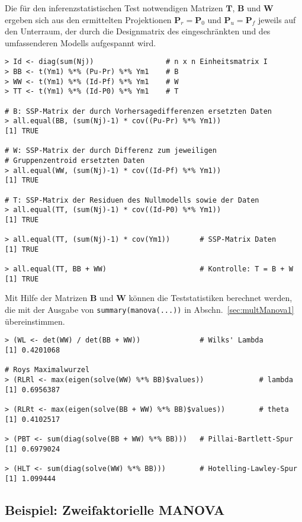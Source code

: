 Die für den inferenzstatistischen Test notwendigen Matrizen $\bm{T}$, $\bm{B}$ und $\bm{W}$ ergeben sich aus den ermittelten Projektionen $\bm{P}_{r} = \bm{P}_{0}$ und $\bm{P}_{u} = \bm{P}_{f}$ jeweils auf den Unterraum, der durch die Designmatrix des eingeschränkten und des umfassenderen Modells aufgespannt wird.
\begin{lstlisting}
> Id <- diag(sum(Nj))                 # n x n Einheitsmatrix I
> BB <- t(Ym1) %*% (Pu-Pr) %*% Ym1    # B
> WW <- t(Ym1) %*% (Id-Pf) %*% Ym1    # W
> TT <- t(Ym1) %*% (Id-P0) %*% Ym1    # T

# B: SSP-Matrix der durch Vorhersagedifferenzen ersetzten Daten
> all.equal(BB, (sum(Nj)-1) * cov((Pu-Pr) %*% Ym1))
[1] TRUE

# W: SSP-Matrix der durch Differenz zum jeweiligen
# Gruppenzentroid ersetzten Daten
> all.equal(WW, (sum(Nj)-1) * cov((Id-Pf) %*% Ym1))
[1] TRUE

# T: SSP-Matrix der Residuen des Nullmodells sowie der Daten
> all.equal(TT, (sum(Nj)-1) * cov((Id-P0) %*% Ym1))
[1] TRUE

> all.equal(TT, (sum(Nj)-1) * cov(Ym1))       # SSP-Matrix Daten
[1] TRUE

> all.equal(TT, BB + WW)                      # Kontrolle: T = B + W
[1] TRUE
\end{lstlisting}

Mit Hilfe der Matrizen $\bm{B}$ und $\bm{W}$ können die Teststatistiken berechnet werden, die mit der Ausgabe von \lstinline!summary(manova(...))! in Abschn.\ \ref{sec:multManova1} übereinstimmen.
\begin{lstlisting}
> (WL <- det(WW) / det(BB + WW))              # Wilks' Lambda
[1] 0.4201068

# Roys Maximalwurzel
> (RLRl <- max(eigen(solve(WW) %*% BB)$values))             # lambda
[1] 0.6956387

> (RLRt <- max(eigen(solve(BB + WW) %*% BB)$values))        # theta
[1] 0.4102517

> (PBT <- sum(diag(solve(BB + WW) %*% BB)))   # Pillai-Bartlett-Spur
[1] 0.6979024

> (HLT <- sum(diag(solve(WW) %*% BB)))        # Hotelling-Lawley-Spur
[1] 1.099444
\end{lstlisting}

\subsection{Beispiel: Zweifaktorielle MANOVA}
\label{sec:multALMexMan2}

